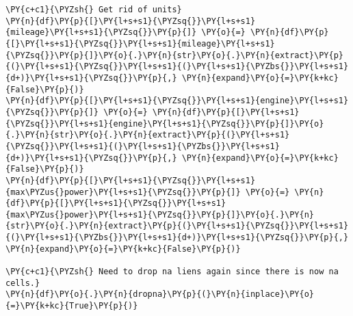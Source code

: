 \begin{tcolorbox}[breakable, size=fbox, boxrule=1pt, pad at break*=1mm,colback=cellbackground, colframe=cellborder]
\begin{Verbatim}[commandchars=\\\{\}]
\PY{c+c1}{\PYZsh{} Get rid of units}
\PY{n}{df}\PY{p}{[}\PY{l+s+s1}{\PYZsq{}}\PY{l+s+s1}{mileage}\PY{l+s+s1}{\PYZsq{}}\PY{p}{]} \PY{o}{=} \PY{n}{df}\PY{p}{[}\PY{l+s+s1}{\PYZsq{}}\PY{l+s+s1}{mileage}\PY{l+s+s1}{\PYZsq{}}\PY{p}{]}\PY{o}{.}\PY{n}{str}\PY{o}{.}\PY{n}{extract}\PY{p}{(}\PY{l+s+s1}{\PYZsq{}}\PY{l+s+s1}{(}\PY{l+s+s1}{\PYZbs{}}\PY{l+s+s1}{d+)}\PY{l+s+s1}{\PYZsq{}}\PY{p}{,} \PY{n}{expand}\PY{o}{=}\PY{k+kc}{False}\PY{p}{)}
\PY{n}{df}\PY{p}{[}\PY{l+s+s1}{\PYZsq{}}\PY{l+s+s1}{engine}\PY{l+s+s1}{\PYZsq{}}\PY{p}{]} \PY{o}{=} \PY{n}{df}\PY{p}{[}\PY{l+s+s1}{\PYZsq{}}\PY{l+s+s1}{engine}\PY{l+s+s1}{\PYZsq{}}\PY{p}{]}\PY{o}{.}\PY{n}{str}\PY{o}{.}\PY{n}{extract}\PY{p}{(}\PY{l+s+s1}{\PYZsq{}}\PY{l+s+s1}{(}\PY{l+s+s1}{\PYZbs{}}\PY{l+s+s1}{d+)}\PY{l+s+s1}{\PYZsq{}}\PY{p}{,} \PY{n}{expand}\PY{o}{=}\PY{k+kc}{False}\PY{p}{)}
\PY{n}{df}\PY{p}{[}\PY{l+s+s1}{\PYZsq{}}\PY{l+s+s1}{max\PYZus{}power}\PY{l+s+s1}{\PYZsq{}}\PY{p}{]} \PY{o}{=} \PY{n}{df}\PY{p}{[}\PY{l+s+s1}{\PYZsq{}}\PY{l+s+s1}{max\PYZus{}power}\PY{l+s+s1}{\PYZsq{}}\PY{p}{]}\PY{o}{.}\PY{n}{str}\PY{o}{.}\PY{n}{extract}\PY{p}{(}\PY{l+s+s1}{\PYZsq{}}\PY{l+s+s1}{(}\PY{l+s+s1}{\PYZbs{}}\PY{l+s+s1}{d+)}\PY{l+s+s1}{\PYZsq{}}\PY{p}{,} \PY{n}{expand}\PY{o}{=}\PY{k+kc}{False}\PY{p}{)}

\PY{c+c1}{\PYZsh{} Need to drop na liens again since there is now na cells.}
\PY{n}{df}\PY{o}{.}\PY{n}{dropna}\PY{p}{(}\PY{n}{inplace}\PY{o}{=}\PY{k+kc}{True}\PY{p}{)}
\end{Verbatim}
\end{tcolorbox}

 \lipsum[1-1]


